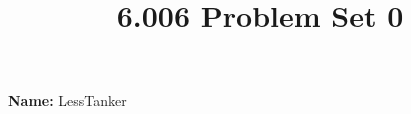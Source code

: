 \documentclass[12pt,twoside]{article}
\title{6.006 Problem Set 0}
\newcommand{\theproblemsetnum}{0}
\begin{document}

\setlength{\parindent}{0pt}
\medskip\hrulefill\medskip

{\bf Name:} LessTanker

\medskip\hrulefill






\end{document}
